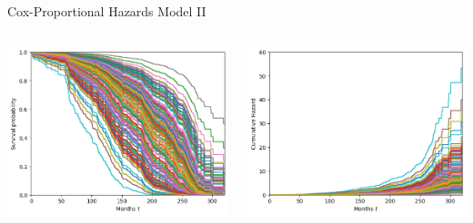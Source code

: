 \documentclass{beamer}
\begin{document}
\begin{frame}{Cox-Proportional Hazards Model II}
    \begin{columns}
        \begin{column}{0.49 \textwidth}
            \centering
            \includegraphics[width = \textwidth]{images/cox_sf.png}
        \end{column}
        \begin{column}{0.49 \textwidth}
            \centering
            \includegraphics[width = \textwidth]{images/cox_chf.png}
        \end{column}
    \end{columns}
\end{frame}
\end{document}
